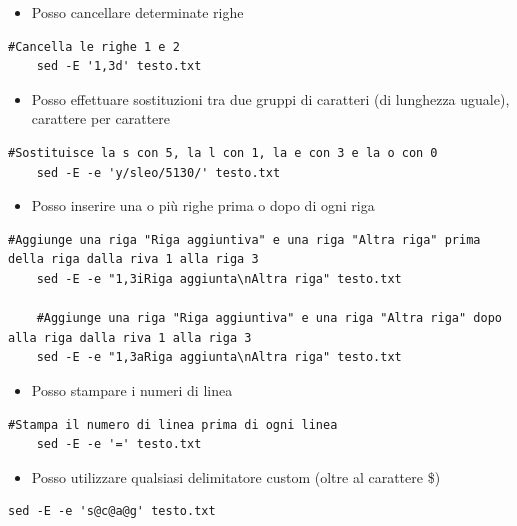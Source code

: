 \documentclass[../main.tex]{subfiles}
\begin{document}
\vspace{0.5cm}
\begin{itemize}
    \item Posso cancellare determinate righe
\end{itemize}
\begin{lstlisting}[style=bash]
    #Cancella le righe 1 e 2
    sed -E '1,3d' testo.txt
\end{lstlisting}

\vspace{0.5cm}
\begin{itemize}
    \item Posso effettuare sostituzioni tra due gruppi di caratteri (di lunghezza uguale), carattere per carattere
\end{itemize}
\begin{lstlisting}[style=bash]
    #Sostituisce la s con 5, la l con 1, la e con 3 e la o con 0
    sed -E -e 'y/sleo/5130/' testo.txt
\end{lstlisting}

\pagebreak
\begin{itemize}
    \item Posso inserire una o più righe prima o dopo di ogni riga
\end{itemize}
\begin{lstlisting}[style=bash]
    #Aggiunge una riga "Riga aggiuntiva" e una riga "Altra riga" prima della riga dalla riva 1 alla riga 3
    sed -E -e "1,3iRiga aggiunta\nAltra riga" testo.txt

    #Aggiunge una riga "Riga aggiuntiva" e una riga "Altra riga" dopo alla riga dalla riva 1 alla riga 3
    sed -E -e "1,3aRiga aggiunta\nAltra riga" testo.txt
\end{lstlisting}

\vspace{0.5cm}
\begin{itemize}
    \item Posso stampare i numeri di linea
\end{itemize}
\begin{lstlisting}[style=bash]
    #Stampa il numero di linea prima di ogni linea
    sed -E -e '=' testo.txt
\end{lstlisting}

\vspace{0.5cm}
\begin{itemize}
    \item Posso utilizzare qualsiasi delimitatore custom (oltre al carattere \$)
\end{itemize}
\begin{lstlisting}[style=bash]
    sed -E -e 's@c@a@g' testo.txt
\end{lstlisting}
\end{document}
